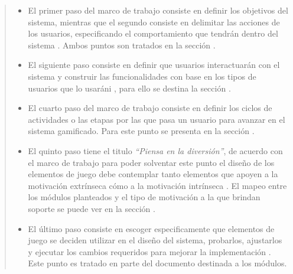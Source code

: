     \begin{quote}
    \begin{itemize}
    \item El primer paso del marco de trabajo consiste en definir los objetivos del
          sistema, mientras que el segundo consiste en delimitar las acciones de los
          usuarios, especificando el comportamiento que tendrán dentro del sistema 
          \cite[p. 61, 63]{ForTheWin}. Ambos puntos son tratados en la sección .\\

    \item El siguiente paso consiste en definir que usuarios interactuarán con el sistema
          y construir las funcionalidades con base en los tipos de usuarios que lo
          usaráni \cite[p. 64]{ForTheWin}, para ello se destina la sección .\\

    \item El cuarto paso del marco de trabajo consiste en definir los ciclos de actividades
          o las etapas por las que pasa un usuario para avanzar en el sistema gamificado.
          \cite[p. 66]{ForTheWin}
          Para este punto se presenta en la sección .\\

    \item El quinto paso tiene el titulo {\it``Piensa en la diversión''}, de acuerdo con el
          marco de trabajo para poder solventar este punto el diseño de los elementos de
          juego debe contemplar tanto elementos que apoyen a la motivación extrínseca cómo
          a la motivación intrínseca \cite[p. 68]{ForTheWin}. El mapeo entre los módulos
          planteados y el tipo de motivación a la que brindan soporte se puede ver en la
          sección .\\

    \item El último paso consiste en escoger especificamente que elementos de juego se
          deciden utilizar en el diseño del sistema, probarlos, ajustarlos y ejecutar
          los cambios requeridos para mejorar la implementación \cite[p. 69]{ForTheWin}.
          Este punto es tratado en parte del documento destinada a los módulos.
    \end{itemize}
    \end{quote}



